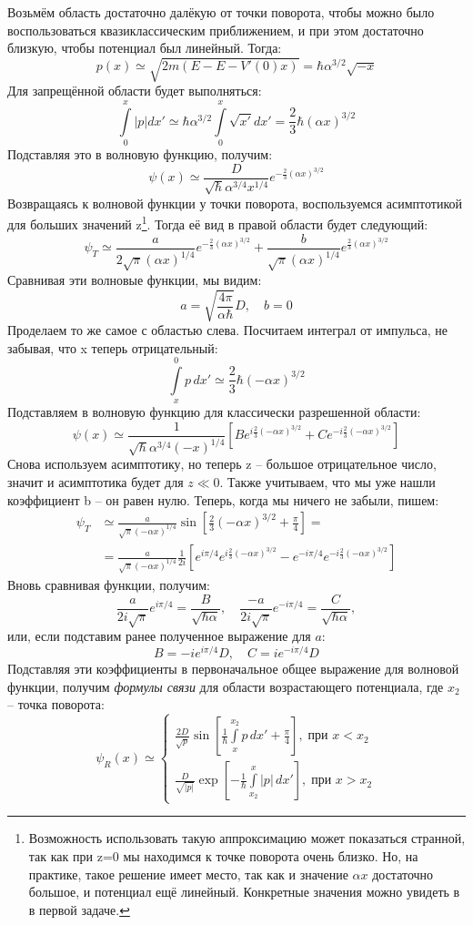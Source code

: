 Возьмём область достаточно далёкую от точки поворота, чтобы можно было воспользоваться квазиклассическим приближением, и при этом достаточно близкую, чтобы потенциал был линейный. Тогда:
\[
p(x) \simeq \sqrt{2m (E - E - V'(0)x)} = \hbar\alpha^{3/2}\sqrt{-x}
\]
Для запрещённой области будет выполняться:
\[
\int\limits_{0}^{x}|p|dx' \simeq \hbar\alpha^{3/2}\int\limits_{0}^{x} \sqrt{x'}dx' = \frac{2}{3}\hbar(\alpha x)^{3/2}
\]
Подставляя это в волновую функцию, получим:
\[
\psi(x) \simeq \frac{D}{\sqrt{\hbar}\alpha^{3/4}x^{1/4}}e^{-\frac{2}{3}(\alpha x)^{3/2}}
\]
Возвращаясь к волновой функции у точки поворота, воспользуемся асимптотикой для больших значений z\footnote{Возможность использовать такую аппроксимацию может показаться странной, так как при z=0 мы находимся к точке поворота очень близко. Но, на практике, такое решение имеет место, так как и значение $\alpha x$ достаточно большое, и потенциал ещё линейный. Конкретные значения можно увидеть в  в первой задаче.}. Тогда её вид в правой области будет следующий:
\[
\psi_T \simeq \frac{a}{2\sqrt{\pi} (\alpha x)^{1/4}}e^{-\frac{2}{3}(\alpha x)^{3/2}} +  \frac{b}{\sqrt{\pi} (\alpha x)^{1/4}}e^{\frac{2}{3}(\alpha x)^{3/2}}
\]
Сравнивая эти волновые функции, мы видим:
\[
a = \sqrt{\frac{4\pi}{\alpha \hbar}}D, \quad b = 0
\]
Проделаем то же самое с областью слева. Посчитаем интеграл от импульса, не забывая, что x теперь отрицательный:
\[
\int\limits_{x}^{0}p\, dx' \simeq \frac{2}{3}\hbar(-\alpha x)^{3/2}
\]
Подставляем в волновую функцию для классически разрешенной области:
\[
\psi(x) \simeq \frac{1}{\sqrt{\hbar}\alpha^{3/4}(-x)^{1/4}}\left[Be^{i\frac{2}{3}(-\alpha x)^{3/2}}+ Ce^{-i\frac{2}{3}(-\alpha x)^{3/2}}\right]
\]
Снова используем асимптотику, но теперь z -- большое отрицательное число, значит и асимптотика будет для $z\ll 0$. Также учитываем, что мы уже нашли коэффициент b -- он равен нулю. Теперь, когда мы ничего не забыли, пишем:
\begin{align*}
\psi_T & \simeq \frac{a}{\sqrt{\pi}(-\alpha x)^{1/4}}\sin\left[\frac{2}{3}(-\alpha x)^{3/2} + \frac{\pi}{4}\right] = \\ & = \frac{a}{\sqrt{\pi}(-\alpha x)^{1/4}}\frac{1}{2i}\left[ e^{i\pi/4}e^{i\frac{2}{3}(-\alpha x)^{3/2}} - e^{-i\pi/4}e^{-i\frac{2}{3}(-\alpha x)^{3/2}}\right]
\end{align*}
Вновь сравнивая функции, получим:
\[
\frac{a}{2i\sqrt{\pi}}e^{i\pi/4} = \frac{B}{\sqrt{\hbar \alpha}}, \quad \frac{-a}{2i\sqrt{\pi}}e^{-i\pi/4} = \frac{C}{\sqrt{\hbar \alpha}},
\]
или, если подставим ранее полученное выражение для $a$:
\[
B = -ie^{i\pi/4}D, \quad C = ie^{-i\pi/4}D
\]
Подставляя эти коэффициенты в первоначальное общее выражение для волновой функции, получим \textit{формулы связи} для области возрастающего потенциала, где $x_2$ -- точка поворота:
\[
\psi_R(x) \simeq 
\begin{cases}
    \frac{2D}{\sqrt{p}}\sin\left[ \frac{1}{\hbar} \int\limits_x^{x_2} p\,dx' + \frac{\pi}{4} \right], \; \text{при } x < x_2\\
    \frac{D}{\sqrt{|p|}}\exp\left[-\frac{1}{\hbar} \int\limits_{x_2}^{x} |p|\,dx' \right],\; \text{при } x > x_2
\end{cases}
\]

